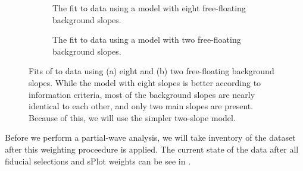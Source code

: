 




\begin{figure}
  \begin{center}
    \begin{subfigure}[t]{\textwidth}
        \begin{center}
          
        \caption{The fit to data using a model with eight free-floating background slopes.}
        \end{center}
        \end{subfigure}
        \begin{subfigure}[t]{\textwidth}
          \begin{center}
            
        \caption{The fit to data using a model with two free-floating background slopes.}
          \end{center}
        \end{subfigure}
        \caption{Fits of  to data using (a) eight and (b) two free-floating background slopes. While the model with eight slopes is better according to information criteria, most of the background slopes are nearly identical to each other, and only two main slopes are present. Because of this, we will use the simpler two-slope model.}\label{fig:splot-fits}
\end{center}
\end{figure}

Before we perform a partial-wave analysis, we will take inventory of the dataset after this weighting proceedure is applied. The current state of the data after all fiducial selections and sPlot weights can be see in .

